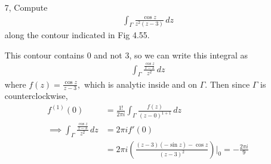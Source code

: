 \documentclass{article}
\begin{document}
\begin{itemize}
	\item[7,] Compute
		\begin{align*}
			\int_{\Gamma} \frac{\cos z}{z^2(z-3)}\, dz
		\end{align*}
		along the contour indicated in Fig 4.55.

		\begin{soln}
			This contour contains 0 and not 3, so we can write this integral as
			\begin{align*}
				\int_\Gamma \frac{\frac{\cos z}{z-3}}{z^2}\, dz
			\end{align*}
			where $f(z)=\frac{\cos z}{z-3},$ which is analytic inside and on $\Gamma.$ Then since $\Gamma$ is counterclockwise, 
			\begin{align*}
				f^{(1)}(0) &= \frac{1!}{2\pi i} \int_\Gamma \frac{f(z)}{(z-0)^{1+1}}\, dz \\
				\implies \int_\Gamma \frac{\frac{\cos z}{z-3}}{z^2}\, dz &= 2\pi i f'(0) \\
				&= 2\pi i \left( \frac{(z-3)(-\sin z) - \cos z}{(z-3)^2} \right)\bigg|_0 = -\frac{2\pi i}{9}
			\end{align*}
		\end{soln}


\end{itemize}
\end{document}
